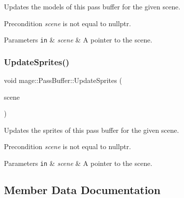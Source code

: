 Updates the models of this pass buffer for the given scene.

\begin{DoxyPrecond}{Precondition}
{\itshape scene} is not equal to {\ttfamily nullptr}. 
\end{DoxyPrecond}

\begin{DoxyParams}[1]{Parameters}
\mbox{\tt in}  & {\em scene} & A pointer to the scene. \\
\hline
\end{DoxyParams}
\hypertarget{structmage_1_1_pass_buffer_a8301fd646965c627f29120f412078ca1}{}\label{structmage_1_1_pass_buffer_a8301fd646965c627f29120f412078ca1} 
\subsubsection{\texorpdfstring{Update\+Sprites()}{UpdateSprites()}}
{\footnotesize\ttfamily void mage\+::\+Pass\+Buffer\+::\+Update\+Sprites (\begin{DoxyParamCaption}\item[{const \hyperlink{classmage_1_1_scene}{Scene} $\ast$}]{scene }\end{DoxyParamCaption})\hspace{0.3cm}{\ttfamily [private]}}

Updates the sprites of this pass buffer for the given scene.

\begin{DoxyPrecond}{Precondition}
{\itshape scene} is not equal to {\ttfamily nullptr}. 
\end{DoxyPrecond}

\begin{DoxyParams}[1]{Parameters}
\mbox{\tt in}  & {\em scene} & A pointer to the scene. \\
\hline
\end{DoxyParams}


\subsection{Member Data Documentation}
\hypertarget{structmage_1_1_pass_buffer_aafbd5cadbc04af03c6bce4eeb4a362f4}{}\label{structmage_1_1_pass_buffer_aafbd5cadbc04af03c6bce4eeb4a362f4} 
